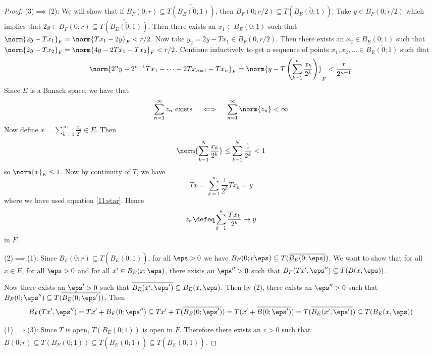 \begin{proof}
	(3)$\implies$(2):
	We will show that if $B_F(0;r) \subseteq \overline{T(\overline{B_E(0;1)})}$, then $B_F(0;r/2) \subseteq T(\overline{B_E(0;1)})$.
	Take $y \in B_F(0;r/2)$ which implies that $2y \in B_F(0;r) \subseteq \overline{T(\overline{B_E(0;1)})}$.
	Then there exists an $x_1 \in B_E(0;1)$ such that $\norm{2y-Tx_1}_F=\norm{Tx_1-2y}_F<r/2$.
	Now take $y_2 = 2y-Tx_1 \in B_F(0,r/2)$.
	Then there exists an $x_2 \in B_E(0;1)$ such that $\norm{2y-Tx_2}_F=\norm{4y-2Tx_1-Tx_2}_F<r/2$.
	Continue inductively to get a sequence of points $x_1,x_2,\ldots \in \overline{B_E(0;1)}$ such that
	\begin{equation}\label{11:star}
		\norm{2^ny-2^{n-1}Tx_1-\cdots-2Tx_{n=1}-Tx_n}_F = \norm{y-T\left(\sum_{k=1}^n \frac{x_k}{2^k}\right)}_F < \frac r{2^{n+1}}
	\end{equation}
	Since $E$ is a Banach space, we have that
	\[\sum_{n=1}^\infty z_n \text{ exists} \quad \iff \quad \sum_{n=1}^\infty \norm{z_n} < \infty\]
	Now define $x = \sum_{k=1}^\infty \frac{x_k}{2^k} \in E$.
	Then
	\[\norm{\sum_{k=1}^N \frac{x_k}{2^k}} \leq \sum_{k=1}^N \frac 1{2^k} <1\]
	so $\norm{x}_E \leq 1$.
	Now by continuity of $T$, we have
	\[Tx = \sum_{k=1}^\infty \frac 1{2^k} Tx_k = y\]
	where we have used equation \ref{11:star}.
	Hence
	\[z_n \defeq \sum_{k=1}^n \frac{Tx_k}{2^k} \to y\]
	in $F$.
	
	(2)$\implies$(1):
	Since $B_F(0;r) \subseteq T(\overline{B_E(0:1)})$, for all $\eps>0$ we have $B_F(0;r\eps) \subseteq T(\overline{B_E(0;\eps)})$.
	We want to show that for all $x \in E$, for all $\eps>0$ and for all $x' \in B_E(x;\eps)$, there exists an $\eps''>0$ such that $B_F(Tx',\eps'') \subseteq T(B(x,\eps))$.


	Now there exists an $\eps'>0$ such that $\overline{B_E(x',\eps')} \subseteq B_E(x,\eps)$.
	Then by (2), there exists an $\eps''>0$ such that $B_F(0;\eps'') \subseteq T(\overline{B_E(0;\eps')})$.
	Then
	\[B_F(Tx',\eps'') = Tx'+B_F(0;\eps'') \subseteq Tx' + T(\overline{B_E(0;\eps')}) = T(x'+\overline{B(0;\eps')}) = T(\overline{B_E(x',\eps')}) \subseteq T(B_E(x,\eps))\]
	
	(1)$\implies$(3):
	Since $T$ is open, $T(B_E(0;1))$ is open in $F$.
	Therefore there exists an $r>0$ such that $B(0;r) \subseteq T(B_E(0;1)) \subseteq T(\overline{B_E(0;1)}) \subseteq \overline{T(\overline{B_E(0;1)})}$.
\end{proof}


